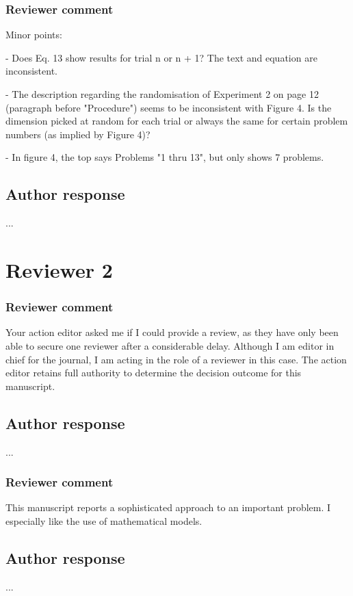 \documentclass[12pt]{article}
\begin{document}
\subsubsection{Reviewer comment}
Minor points:

- Does Eq. 13 show results for trial n or n + 1? The text
and equation are inconsistent.

- The description regarding the randomisation of Experiment
2 on page 12 (paragraph before "Procedure") seems to be
inconsistent with Figure 4. Is the dimension picked at
random for each trial or always the same for certain problem
numbers (as implied by Figure 4)?

- In figure 4, the top says Problems "1 thru 13", but only
shows 7 problems.

\subsection{Author response}
...

\section{Reviewer 2}

\subsubsection{Reviewer comment}
Your action editor asked me if I could provide a review, as
they have only been able to secure one reviewer after a
considerable delay. Although I am editor in chief for the
journal, I am acting in the role of a reviewer in this case.
The action editor retains full authority to determine the
decision outcome for this manuscript.

\subsection{Author response}
...

\subsubsection{Reviewer comment}
This manuscript reports a sophisticated approach to an
important problem. I especially like the use of mathematical
models.

\subsection{Author response}
...
\end{document}
